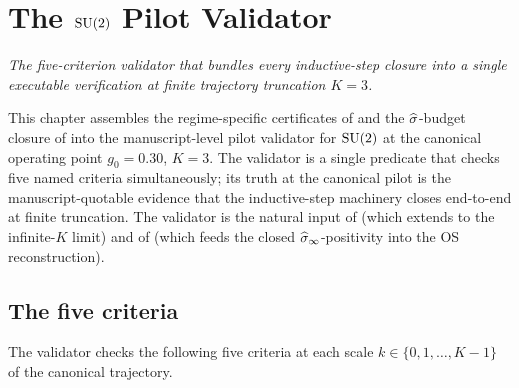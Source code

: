 %

\chapter{The \texorpdfstring{$\mathrm{SU}(2)$}{SU(2)} Pilot Validator}
\label{ch:pilot-su2}

\noindent\emph{The five-criterion validator that bundles every
inductive-step closure into a single executable verification at
finite trajectory truncation $K = 3$.}

This chapter assembles the regime-specific certificates of
 and the
$\widehat{\sigma}$-budget closure of  into the
manuscript-level pilot validator for $\mathrm{SU}(2)$ at the canonical
operating point $g_0 = 0.30$, $K = 3$.  The validator is a single
predicate that checks five named criteria simultaneously; its
truth at the canonical pilot is the manuscript-quotable evidence
that the inductive-step machinery closes end-to-end at finite
truncation.  The validator is the natural input of
 (which extends to the infinite-$K$ limit)
and of  (which feeds the closed
$\widehat{\sigma}_\infty$-positivity into the OS reconstruction).

\section{The five criteria}
\label{sec:five-criteria}

%

The validator checks the following five criteria at each scale
$k \in \{0, 1, \dots, K-1\}$ of the canonical trajectory.


